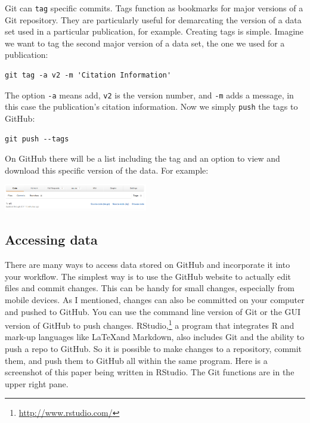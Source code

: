 \documentclass[twocolumn]{article}\usepackage{graphicx, color}
\makeatletter
\newenvironment{kframe}{%
 \def\at@end@of@kframe{}%
 \ifinner\ifhmode%
  \def\at@end@of@kframe{\end{minipage}}%
  \begin{minipage}{\columnwidth}%
 \fi\fi%
 \def\FrameCommand##1{\hskip\@totalleftmargin \hskip-\fboxsep
 \colorbox{shadecolor}{##1}\hskip-\fboxsep
     \hskip-\linewidth \hskip-\@totalleftmargin \hskip\columnwidth}%
 \MakeFramed {\advance\hsize-\width
   \@totalleftmargin\z@ \linewidth\hsize
   \@setminipage}}%
 {\par\unskip\endMakeFramed%
 \at@end@of@kframe}
\newenvironment{knitrout}{}{} %
\makeatother
\begin{document}
Git can \texttt{tag} specific commits. Tags function as bookmarks for major versions of a Git repository. They are particularly useful for demarcating the version of a data set used in a particular publication, for example. Creating tags is simple. Imagine we want to tag the second major version of a data set, the one we used for a publication:

\begin{knitrout}
\color{fgcolor}\begin{kframe}
\begin{verbatim}
git tag -a v2 -m 'Citation Information'
\end{verbatim}
\end{kframe}
\end{knitrout}


\noindent The option \texttt{-a} means add, \texttt{v2} is the version number, and \texttt{-m} adds a message, in this case the publication's citation information. Now we simply \texttt{push} the tags to GitHub:

\begin{knitrout}
\color{fgcolor}\begin{kframe}
\begin{verbatim}
git push --tags
\end{verbatim}
\end{kframe}
\end{knitrout}


\noindent On GitHub there will be a list including the tag and an option to view and download this specific version of the data. For example:

\begin{center}
	\includegraphics[width=0.47\textwidth]{images/GitTag.png}
\end{center}

\subsection{Accessing data}

There are many ways to access data stored on GitHub and incorporate it into your workflow. The simplest way is to use the GitHub website to actually edit files and commit changes. This can be handy for small changes, especially from mobile devices. As I mentioned, changes can also be committed on your computer and pushed to GitHub. You can use the command line version of Git or the GUI version of GitHub to push changes. RStudio,\footnote{\url{http://www.rstudio.com/}} a program that integrates R and mark-up languages like \LaTeX and Markdown, also includes Git and the ability to push a repo to GitHub. So it is possible to make changes to a repository, commit them, and push them to GitHub all within the same program. Here is a screenshot of this paper being written in RStudio. The Git functions are in the upper right pane. 
\end{document}
